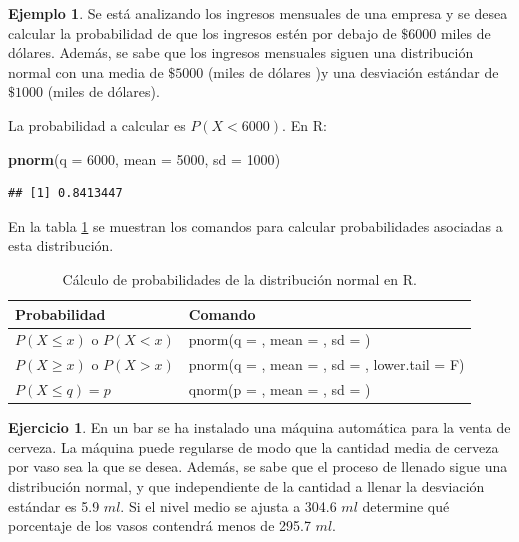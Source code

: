\documentclass[
  11pt,
]{book}
\newenvironment{Shaded}{\begin{snugshade}}{\end{snugshade}}
\newcommand{\AttributeTok}[1]{\textcolor[rgb]{0.13,0.29,0.53}{#1}}
\newcommand{\DecValTok}[1]{\textcolor[rgb]{0.00,0.00,0.81}{#1}}
\newcommand{\FunctionTok}[1]{\textcolor[rgb]{0.13,0.29,0.53}{\textbf{#1}}}
\newcommand{\NormalTok}[1]{#1}
\newcommand{\gt}{>}
\newcommand{\lt}{<}
\theoremstyle{definition}
\theoremstyle{definition}
\newtheorem{example}{Ejemplo}[chapter]
\theoremstyle{definition}
\newtheorem{exercise}{Ejercicio}[chapter]
\theoremstyle{definition}
\theoremstyle{remark}
\begin{document}
\begin{example}

Se está analizando los ingresos mensuales de una empresa y se desea calcular la probabilidad de que los ingresos estén por debajo de \(\$6000\) miles de dólares. Además, se sabe que los ingresos mensuales siguen una distribución normal con una media de \(\$5000\) (miles de dólares )y una desviación estándar de \(\$1000\) (miles de dólares).

La probabilidad a calcular es \(P(X < 6000)\). En R:

\begin{Shaded}
\begin{Highlighting}[]
\FunctionTok{pnorm}\NormalTok{(}\AttributeTok{q =} \DecValTok{6000}\NormalTok{, }\AttributeTok{mean =} \DecValTok{5000}\NormalTok{, }\AttributeTok{sd =} \DecValTok{1000}\NormalTok{)}
\end{Highlighting}
\end{Shaded}

\begin{verbatim}
## [1] 0.8413447
\end{verbatim}

\end{example}

En la tabla \ref{tab:continuaRnormal} se muestran los comandos para calcular probabilidades asociadas a esta distribución.

\begin{table}[H]
\centering
\caption{\label{tab:continuaRnormal}Cálculo de probabilidades de la distribución normal en R.}
\centering
\begin{tabular}[t]{>{\raggedright\arraybackslash}p{3cm}>{\raggedright\arraybackslash}p{8cm}}
\toprule
Probabilidad & Comando\\
\midrule
$P(X \leq x)$ o $P(X \lt x)$ & pnorm(q = , mean = , sd = )\\
$P(X \geq x)$ o $P(X \gt x)$ & pnorm(q = , mean = , sd = , lower.tail = F)\\
$P(X \leq q) = p$ & qnorm(p = , mean = , sd = )\\
\bottomrule
\end{tabular}
\end{table}

\begin{exercise}
En un bar se ha instalado una máquina automática para la venta de cerveza. La máquina puede regularse de modo que la cantidad media de cerveza por vaso sea la que se desea. Además, se sabe que el proceso de llenado sigue una distribución normal, y que independiente de la cantidad a llenar la desviación estándar es 5.9 \(ml\). Si el nivel medio se ajusta a 304.6 \(ml\) determine qué porcentaje de los vasos contendrá menos de 295.7 \(ml\).
\end{exercise}
\end{document}

